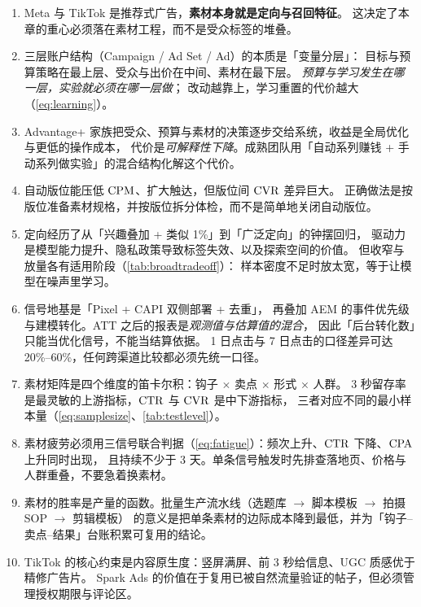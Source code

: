 \begin{keypoint}[本章要点回顾]
\begin{enumerate}
  \item Meta 与 TikTok 是推荐式广告，\textbf{素材本身就是定向与召回特征}。
        这决定了本章的重心必须落在素材工程，而不是受众标签的堆叠。
  \item 三层账户结构（Campaign / Ad Set / Ad）的本质是「变量分层」：
        目标与预算策略在最上层、受众与出价在中间、素材在最下层。
        \emph{预算与学习发生在哪一层，实验就必须在哪一层做}；
        改动越靠上，学习重置的代价越大（\cref{eq:learning}）。
  \item Advantage+ 家族把受众、预算与素材的决策逐步交给系统，收益是全局优化与更低的操作成本，
        代价是\emph{可解释性下降}。成熟团队用「自动系列赚钱 + 手动系列做实验」的混合结构化解这个代价。
  \item 自动版位能压低 $\operatorname{CPM}$、扩大触达，但版位间 $\operatorname{CVR}$ 差异巨大。
        正确做法是按版位准备素材规格，并按版位拆分体检，而不是简单地关闭自动版位。
  \item 定向经历了从「兴趣叠加 + 类似 1\%」到「广泛定向」的钟摆回归，
        驱动力是模型能力提升、隐私政策导致标签失效、以及探索空间的价值。
        但收窄与放量各有适用阶段（\cref{tab:broadtradeoff}）：
        样本密度不足时放太宽，等于让模型在噪声里学习。
  \item 信号地基是「Pixel + CAPI 双侧部署 +  去重」，
        再叠加 AEM 的事件优先级与建模转化。ATT 之后的报表是\emph{观测值与估算值的混合}，
        因此「后台转化数」只能当优化信号，不能当结算依据。
        1 日点击与 7 日点击的口径差异可达 20\%--60\%，任何跨渠道比较都必须先统一口径。
  \item 素材矩阵是四个维度的笛卡尔积：钩子 $\times$ 卖点 $\times$ 形式 $\times$ 人群。
        3 秒留存率是最灵敏的上游指标，$\operatorname{CTR}$ 与 $\operatorname{CVR}$ 是中下游指标，
        三者对应不同的最小样本量（\cref{eq:samplesize}、\cref{tab:testlevel}）。
  \item 素材疲劳必须用三信号联合判据（\cref{eq:fatigue}）：频次上升、$\operatorname{CTR}$ 下降、$\operatorname{CPA}$ 上升同时出现，
        且持续不少于 3 天。单条信号触发时先排查落地页、价格与人群重叠，不要急着换素材。
  \item 素材的胜率是产量的函数。批量生产流水线（选题库 $\to$ 脚本模板 $\to$ 拍摄 SOP $\to$ 剪辑模板）
        的意义是把单条素材的边际成本降到最低，并为「钩子--卖点--结果」台账积累可复用的结论。
  \item TikTok 的核心约束是内容原生度：竖屏满屏、前 3 秒给信息、UGC 质感优于精修广告片。
        Spark Ads 的价值在于复用已被自然流量验证的帖子，但必须管理授权期限与评论区。

\end{enumerate}
\end{keypoint}
